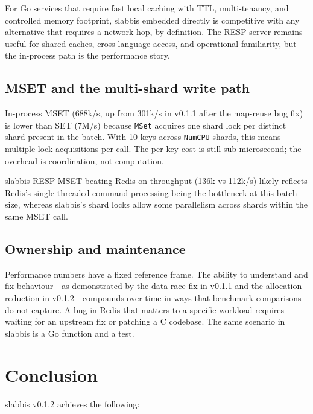 \documentclass[a4paper,11pt]{article}
\begin{document}
For Go services that require fast local caching with TTL, multi-tenancy, and
controlled memory footprint, slabbis embedded directly is competitive with any
alternative that requires a network hop, by definition. The RESP server remains
useful for shared caches, cross-language access, and operational familiarity,
but the in-process path is the performance story.

\subsection{MSET and the multi-shard write path}

In-process MSET (688k/s, up from 301k/s in v0.1.1 after the map-reuse bug
fix) is lower than SET (7M/s) because \texttt{MSet} acquires one shard lock
per distinct shard present in the batch. With 10 keys across \texttt{NumCPU}
shards, this means multiple lock acquisitions per call. The per-key cost is
still sub-microsecond; the overhead is coordination, not computation.

slabbis-RESP MSET beating Redis on throughput (136k vs 112k/s) likely reflects
Redis's single-threaded command processing being the bottleneck at this batch
size, whereas slabbis's shard locks allow some parallelism across shards within
the same MSET call.

\subsection{Ownership and maintenance}

{\sloppy Performance numbers have a fixed reference frame. The ability to understand and
fix behaviour---as demonstrated by the data race fix in v0.1.1 and
the allocation reduction in v0.1.2---compounds over time in ways that benchmark
comparisons do not capture. A bug in Redis that matters to a specific workload
requires waiting for an upstream fix or patching a C codebase. The same
scenario in slabbis is a Go function and a test.}

\section{Conclusion}

slabbis v0.1.2 achieves the following:
\end{document}
